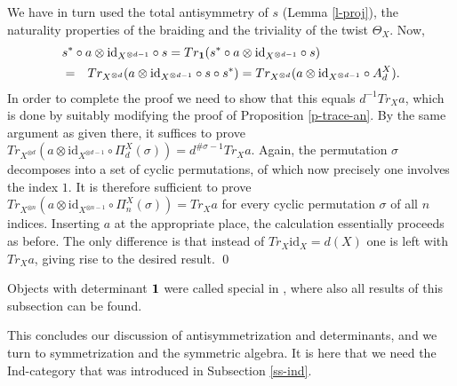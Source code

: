 \documentclass[11pt]{article}
\theoremstyle{definition}
\theoremstyle{definition}
\theoremstyle{remark}
\def\1#1{{\bf #1}}
\def\ol#1{{\overline #1}}
\newcommand{\mcirc}{\circ}
\newcommand{\rarr}{\rightarrow}
\def\id{\mathrm{id}}
\begin{document}
We have in turn used the total antisymmetry of $s$ (Lemma \ref{l-proj}), the naturality properties 
of the braiding and the triviality of the twist $\Theta_X$. Now, 
\begin{eqnarray*} \lefteqn{ s^*\circ a\otimes\id_{X^{\otimes d-1}}\circ s
  = Tr_\11(s^*\circ a\otimes\id_{X^{\otimes d-1}}\circ
  s) } && \\
  &=& Tr_{X^{\otimes d}}(a\otimes\id_{X^{\otimes
      d-1}}\circ s\circ s^*)   
  = Tr_{X^{\otimes d}}(a\otimes\id_{X^{\otimes d-1}}\circ A^X_d).
\end{eqnarray*}
In order to complete the proof we need to show that this equals $d^{-1}Tr_Xa$, which is done by
suitably modifying the proof of Proposition \ref{p-trace-an}. By the same argument as given there,
it suffices to prove 
$Tr_{X^{\otimes d}}(a\otimes\id_{X^{\otimes d-1}}\mcirc \Pi^X_d(\sigma))=d^{\#\sigma -1}Tr_Xa$.
Again, the permutation $\sigma$ decomposes into a set of cyclic permutations, of which now precisely
one involves the index $1$. It is therefore sufficient to prove
$Tr_{X^{\otimes n}}(a\otimes\id_{X^{\otimes n-1}}\mcirc \Pi^X_n(\sigma))=Tr_Xa$ for every cyclic
permutation $\sigma$ of all $n$ indices. Inserting $a$ at the appropriate place, the calculation
essentially proceeds as before. The only difference is that instead of $Tr_X\id_X=d(X)$ one is left
with $Tr_Xa$, giving rise to the desired result.
\qed

\brem Objects with determinant $\11$ were called special in \cite{DR}, where also all results of
this subsection can be found. 
\erem



This concludes our discussion of antisymmetrization  and determinants, and we turn to
symmetrization and the symmetric algebra. It is here that we need the Ind-category that was
introduced in Subsection \ref{ss-ind}.
\end{document}
